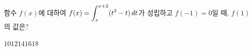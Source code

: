 함수 $f(x)$에 대하여 $f(x)=\displaystyle\int_{x}^{x+2}(t^3-t)\mkern3mu dt$가 성립하고 $f(-1)=0$일 때, $f(1)$의 값은?
\begin{choices32}{$10$}{$12$}{$14$}{$16$}{$18$}\end{choices32}
